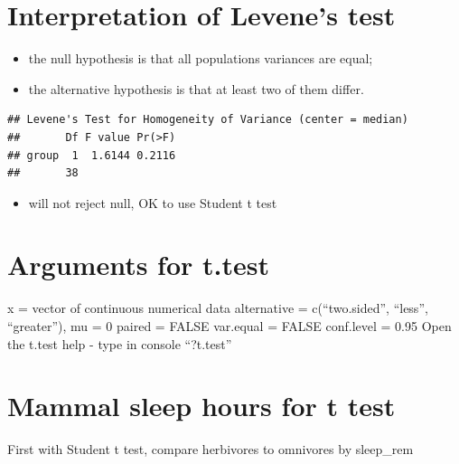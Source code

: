 \documentclass[
]{book}
\newenvironment{Shaded}{\begin{snugshade}}{\end{snugshade}}
\newcommand{\DataTypeTok}[1]{\textcolor[rgb]{0.13,0.29,0.53}{#1}}
\newcommand{\KeywordTok}[1]{\textcolor[rgb]{0.13,0.29,0.53}{\textbf{#1}}}
\newcommand{\NormalTok}[1]{#1}
\newcommand{\OperatorTok}[1]{\textcolor[rgb]{0.81,0.36,0.00}{\textbf{#1}}}
\newcommand{\OtherTok}[1]{\textcolor[rgb]{0.56,0.35,0.01}{#1}}
\newcommand{\StringTok}[1]{\textcolor[rgb]{0.31,0.60,0.02}{#1}}
\providecommand{\tightlist}{%
  \setlength{\itemsep}{0pt}\setlength{\parskip}{0pt}}
\begin{document}
\hypertarget{interpretation-of-levenes-test}{%
\section{Interpretation of Levene's test}\label{interpretation-of-levenes-test}}

\begin{itemize}
\tightlist
\item
  the null hypothesis is that all populations variances are equal;
\item
  the alternative hypothesis is that at least two of them differ.
\end{itemize}

\begin{verbatim}
## Levene's Test for Homogeneity of Variance (center = median)
##       Df F value Pr(>F)
## group  1  1.6144 0.2116
##       38
\end{verbatim}

\begin{itemize}
\tightlist
\item
  will not reject null, OK to use Student t test
\end{itemize}

\hypertarget{arguments-for-t.test}{%
\section{Arguments for t.test}\label{arguments-for-t.test}}

x = vector of continuous numerical data
alternative = c(``two.sided'', ``less'', ``greater''),
mu = 0
paired = FALSE
var.equal = FALSE
conf.level = 0.95
Open the t.test help - type in console ``?t.test''

\hypertarget{mammal-sleep-hours-for-t-test}{%
\section{Mammal sleep hours for t test}\label{mammal-sleep-hours-for-t-test}}

First with Student t test, compare herbivores to omnivores by sleep\_rem

\begin{Shaded}
\end{Shaded}
\end{document}
